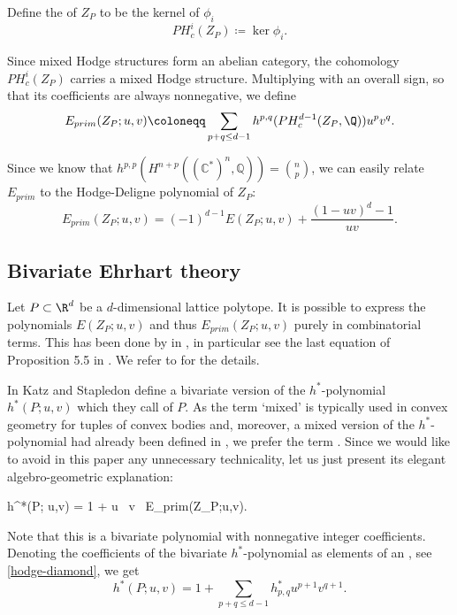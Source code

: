 \documentclass[reqno, 11pt, a4paper, oneside]{amsart}
\begin{document}
\begin{dfn}
    Define the  of $Z_P$ to be the kernel of $\phi_i$
    \[ PH^i_c(Z_P) \coloneqq \ker \phi_i. \] 
\end{dfn}
 Since mixed Hodge structures form an abelian category, the cohomology $ PH^i_c(Z_P)$ carries a mixed Hodge structure. 
Multiplying with an overall sign, so that its coefficients are always nonnegative,  we define
 \[ E_{prim}(Z_P; u,v) \coloneqq 
  \sum_{p+q \leq d-1} h^{p,q} (PH^{d-1}_c(Z_P, \Q)) u^p v^q  . \] 
 
 Since we know that $ h^{p,p}(H^{n+p}((\mathbb{C}^*)^n, \mathbb{Q})) = \binom{n}{p}$, we can easily relate $E_{prim}$ to the Hodge-Deligne polynomial of $Z_P$:
\begin{equation}
\label{eprim_hyp} E_{prim}(Z_P; u,v) = (-1)^{d-1} E(Z_P; u,v) + \frac{(1- u v)^{d} -1 }{ u v }.  \end{equation} 


\subsection{Bivariate Ehrhart theory}

Let $P \subset \R^d$ be a $d$-dimensional lattice polytope. It is possible to express the polynomials $E(Z_P;u,v)$ and thus $E_{prim}(Z_P;u,v)$ purely in combinatorial terms. This has been done by in \cite{batyrev_mirror_1996, borisov_string_2003}, in particular see the last equation of Proposition 5.5 in \cite{borisov_string_2003}. We refer to \cite{katz_local_2016,borger_thin_2023} for the details. 

In \cite[Def.~7.5]{katz_local_2016} Katz and Stapledon define a bivariate version of the $h^*$-polynomial $h^*(P;u,v)$ which they call  of $P$. As the term `mixed' is typically used in convex geometry for tuples of convex bodies and, moreover, a mixed version of the $h^*$-polynomial had already been defined in \cite{mixedEhrhart}, we prefer the term . Since we would like to avoid in this paper any unnecessary technicality, let us just present its elegant algebro-geometric explanation:

\be \label{eprim} h^*(P; u,v) = 1 + u~ v ~E_{prim}(Z_P;u,v).\ee

Note that this is a bivariate polynomial with nonnegative integer coefficients. Denoting the coefficients of the bivariate $h^*$-polynomial as elements of an , see \eqref{hodge-diamond}, we get
\[h^*(P;u,v) = 1+ \sum_{p+q \le d-1} h^*_{p,q} u^{p+1} v^{q+1}.\]
\end{document}
